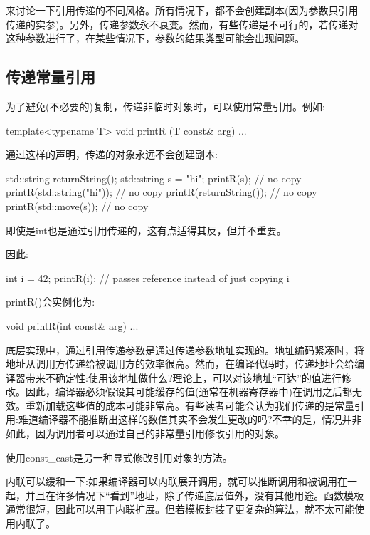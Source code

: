 
来讨论一下引用传递的不同风格。所有情况下，都不会创建副本(因为参数只引用传递的实参)。另外，传递参数永不衰变。然而，有些传递是不可行的，若传递对这种参数进行了，在某些情况下，参数的结果类型可能会出现问题。

\subsection{传递常量引用}

为了避免(不必要的)复制，传递非临时对象时，可以使用常量引用。例如:

\begin{cpp}
template<typename T>
void printR (T const& arg) {
	...
}
\end{cpp}

通过这样的声明，传递的对象永远不会创建副本:

\begin{cpp}
std::string returnString();
std::string s = "hi";
printR(s); // no copy
printR(std::string("hi")); // no copy
printR(returnString()); // no copy
printR(std::move(s)); // no copy
\end{cpp}

即使是int也是通过引用传递的，这有点适得其反，但并不重要。

因此:

\begin{cpp}
int i = 42;
printR(i); // passes reference instead of just copying i
\end{cpp}

printR()会实例化为:

\begin{cpp}
void printR(int const& arg) {
	...
}
\end{cpp}

底层实现中，通过引用传递参数是通过传递参数地址实现的。地址编码紧凑时，将地址从调用方传递给被调用方的效率很高。然而，在编译代码时，传递地址会给编译器带来不确定性:使用该地址做什么?理论上，可以对该地址“可达”的值进行修改。因此，编译器必须假设其可能缓存的值(通常在机器寄存器中)在调用之后都无效。重新加载这些值的成本可能非常高。有些读者可能会认为我们传递的是常量引用:难道编译器不能推断出这样的数值其实不会发生更改的吗?不幸的是，情况并非如此，因为调用者可以通过自己的非常量引用修改引用的对象。

\begin{notice}使用const\_cast是另一种显式修改引用对象的方法。
\end{notice}

内联可以缓和一下:如果编译器可以内联展开调用，就可以推断调用和被调用在一起，并且在许多情况下“看到”地址，除了传递底层值外，没有其他用途。函数模板通常很短，因此可以用于内联扩展。但若模板封装了更复杂的算法，就不太可能使用内联了。

